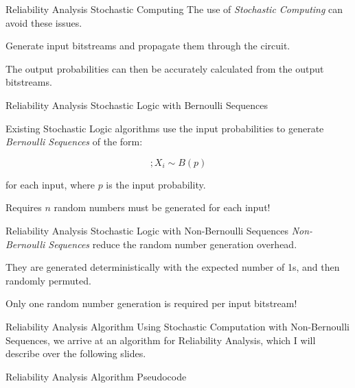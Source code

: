 \documentclass[12pt]{beamer}
\begin{document}
\begin{frame}{Reliability Analysis \small Stochastic Computing}
The use of \emph{Stochastic Computing} can avoid these issues. 
\vspace{0.25cm}

Generate input bitstreams and propagate them through the circuit.
\vspace{0.25cm}

The output probabilities can then be accurately calculated from the output bitstreams.
\end{frame}

\begin{frame}{Reliability Analysis \small Stochastic Logic with Bernoulli Sequences}

Existing Stochastic Logic algorithms use the input probabilities to generate \emph{Bernoulli Sequences} of the form:

\begin{equation*}
[X_0, X_1 \dots X_{n-1}]; X_i \sim B(p)
\end{equation*}

for each input, where $p$ is the input probability.
\vspace{0.25cm}

Requires $n$ random numbers must be generated for each input!
\end{frame}

\begin{frame}{Reliability Analysis \small Stochastic Logic with Non-Bernoulli Sequences}
\emph{Non-Bernoulli Sequences} reduce the random number generation overhead.
\vspace{0.25cm}

They are generated deterministically with the expected number of 1s, and then randomly permuted.
\vspace{0.25cm}

Only one random number generation is required per input bitstream!
\end{frame}

\begin{frame}{Reliability Analysis Algorithm}
Using Stochastic Computation with Non-Bernoulli Sequences, we arrive at an algorithm for Reliability Analysis, which I will describe over the following slides.
\end{frame}

\begin{frame}[fragile]{Reliability Analysis Algorithm \small Pseudocode}
\begin{algorithm}[H]
\end{algorithm}
\end{frame}
\end{document}
